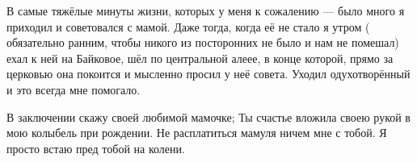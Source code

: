 В самые тяжёлые  минуты жизни, которых у меня к сожалению — было много я
приходил и советовался с мамой. Даже тогда, когда её не стало я  утром (
обязательно ранним, чтобы никого из посторонних не было и нам не помешал) ехал
к ней  на Байковое, шёл по центральной алеее,  в конце которой, прямо за
церковью она покоится и мысленно просил у неё совета. Уходил одухотворённый и
это всегда мне помогало.

В заключении скажу своей любимой мамочке; Ты счастье вложила своею рукой в мою
колыбель при рождении. Не расплатиться мамуля  ничем мне с тобой. Я просто
встаю пред тобой на колени.


